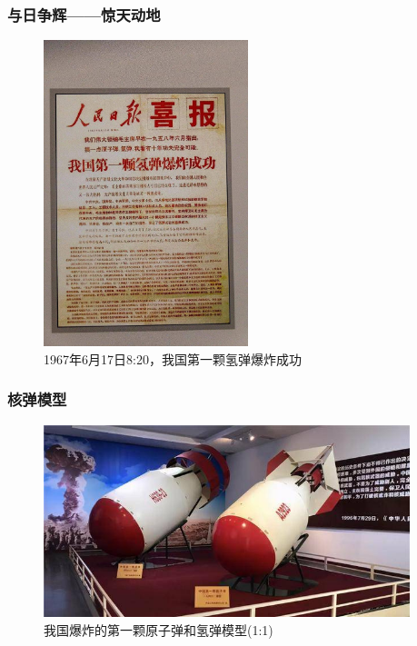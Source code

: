 \begin{frame}
    \frametitle{与日争辉——惊天动地}
    \vspace{-0.4cm}
            \begin{figure}
                \includegraphics[width=0.53\textwidth, viewport=10 30 760 1000,clip]{Figures_History/People_Daily-2.jpeg}
		\caption{\tiny{\textrm{1967}年\textrm{6}月\textrm{17}日\textrm{8:20}，我国第一颗氢弹爆炸成功}}
            \end{figure}
\end{frame}

\begin{frame}
    \frametitle{核弹模型}
            \begin{figure}
                \includegraphics[width=0.95\textwidth]{Figures_History/Model.jpeg}
		\caption{\tiny{我国爆炸的第一颗原子弹和氢弹模型\textrm(1:1)}}
            \end{figure}
\end{frame}

